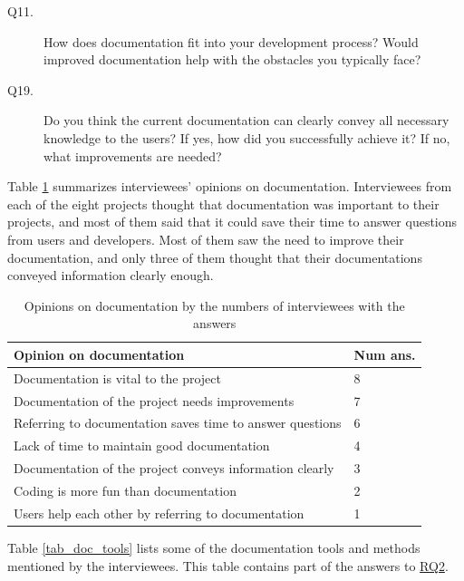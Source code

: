 \documentclass[final, 3p, times, authoryear]{elsarticle}
\begin{document}
\begin{description}
\item[Q11.] How does documentation fit into your development process? Would
improved documentation help with the obstacles you typically face?
\item[Q19.] Do you think the current documentation can clearly convey all
necessary knowledge to the users? If yes, how did you successfully achieve it?
If no, what improvements are needed?
\end{description}

Table \ref{tab_opinion_doc} summarizes interviewees' opinions on documentation.
Interviewees from each of the eight projects thought that documentation was
important to their projects, and most of them said that it could save their time
to answer questions from users and developers. Most of them saw the need to
improve their documentation, and only three of them thought that their
documentations conveyed information clearly enough. 

\begin{table}[ht]
\centering
\begin{tabular}{ll}
\hline
Opinion on documentation & Num ans. \\ \hline
Documentation is vital to the project& 8 \\
Documentation of the project needs improvements & 7 \\
Referring to documentation saves time to answer questions & 6 \\
Lack of time to maintain good documentation & 4 \\
Documentation of the project conveys information clearly & 3 \\
Coding is more fun than documentation & 2 \\
Users help each other by referring to documentation & 1 \\ \hline
\end{tabular}
\caption{\label{tab_opinion_doc}Opinions on documentation by the numbers of
interviewees with the answers}
\end{table}

Table \ref{tab_doc_tools} lists some of the documentation tools and methods
mentioned by the interviewees. This table contains part of the answers to
\hyperlink{rq2}{RQ2}.
\end{document}

